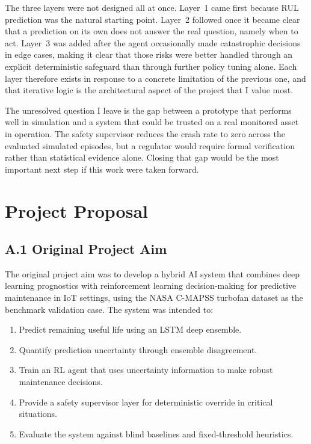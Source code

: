\documentclass[12pt,a4paper]{report}
\begin{document}
The three layers were not designed all at once. Layer~1 came first because RUL prediction was the natural starting point. Layer~2 followed once it became clear that a prediction on its own does not answer the real question, namely when to act. Layer~3 was added after the agent occasionally made catastrophic decisions in edge cases, making it clear that those risks were better handled through an explicit deterministic safeguard than through further policy tuning alone. Each layer therefore exists in response to a concrete limitation of the previous one, and that iterative logic is the architectural aspect of the project that I value most.

The unresolved question I leave is the gap between a prototype that performs well in simulation and a system that could be trusted on a real monitored asset in operation. The safety supervisor reduces the crash rate to zero across the evaluated simulated episodes, but a regulator would require formal verification rather than statistical evidence alone. Closing that gap would be the most important next step if this work were taken forward.


\newpage




\newpage

\appendix
\chapter{Project Proposal}
\label{app:proposal}

\section*{A.1 Original Project Aim}

The original project aim was to develop a hybrid AI system that combines deep learning prognostics with reinforcement learning decision-making for predictive maintenance in IoT settings, using the NASA C-MAPSS turbofan dataset as the benchmark validation case. The system was intended to:

\begin{enumerate}
    \item Predict remaining useful life using an LSTM deep ensemble.
    \item Quantify prediction uncertainty through ensemble disagreement.
    \item Train an RL agent that uses uncertainty information to make robust maintenance decisions.
    \item Provide a safety supervisor layer for deterministic override in critical situations.
    \item Evaluate the system against blind baselines and fixed-threshold heuristics.
\end{enumerate}
\end{document}

